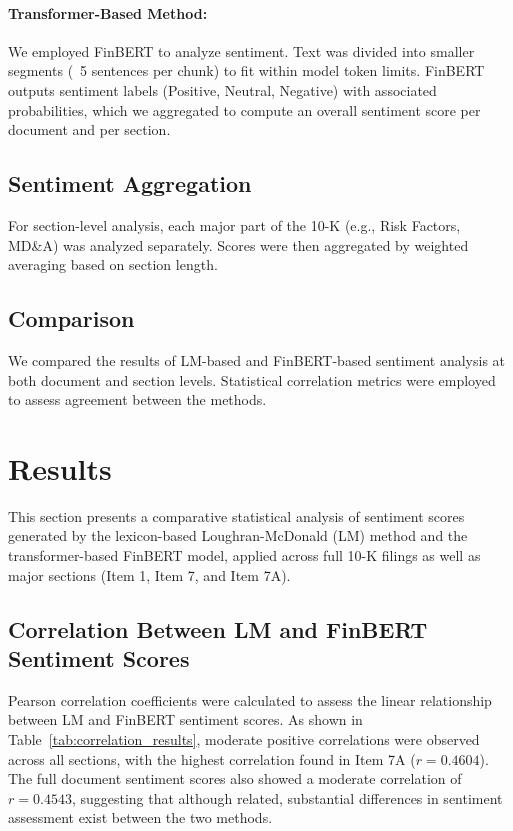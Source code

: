 \documentclass[12pt]{article}
\begin{document}
\paragraph{Transformer-Based Method:} We employed FinBERT to analyze sentiment. Text was divided into smaller segments (~5 sentences per chunk) to fit within model token limits. FinBERT outputs sentiment labels (Positive, Neutral, Negative) with associated probabilities, which we aggregated to compute an overall sentiment score per document and per section.

\subsection{Sentiment Aggregation}
For section-level analysis, each major part of the 10-K (e.g., Risk Factors, MD\&A) was analyzed separately. Scores were then aggregated by weighted averaging based on section length.

\subsection{Comparison}
We compared the results of LM-based and FinBERT-based sentiment analysis at both document and section levels. Statistical correlation metrics were employed to assess agreement between the methods.

\section{Results}

This section presents a comparative statistical analysis of sentiment scores generated by the lexicon-based Loughran-McDonald (LM) method and the transformer-based FinBERT model, applied across full 10-K filings as well as major sections (Item 1, Item 7, and Item 7A).

\subsection{Correlation Between LM and FinBERT Sentiment Scores}

Pearson correlation coefficients were calculated to assess the linear relationship between LM and FinBERT sentiment scores. As shown in Table~\ref{tab:correlation_results}, moderate positive correlations were observed across all sections, with the highest correlation found in Item 7A ($r = 0.4604$). The full document sentiment scores also showed a moderate correlation of $r = 0.4543$, suggesting that although related, substantial differences in sentiment assessment exist between the two methods.
\end{document}
